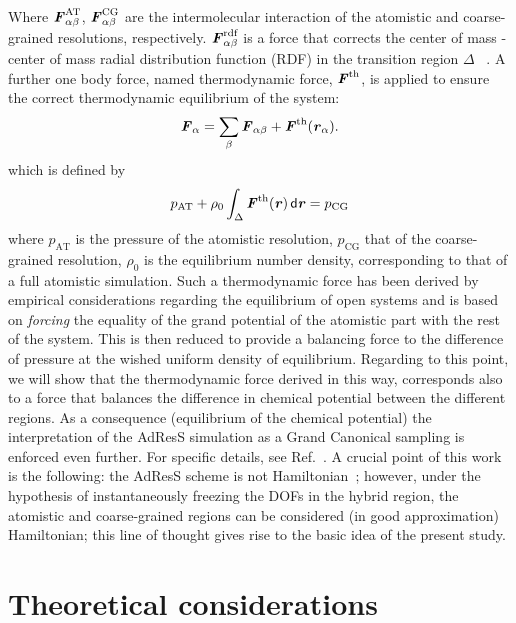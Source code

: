 \documentclass[aip,jcp,a4paper,reprint,onecolumn]{revtex4-1}
\newcommand{\vect}[1]{\textbf{\textit{#1}}}
\newcommand{\dd}[1]{\textsf{#1}}
\newcommand{\AT}{{\textrm{{AT}}}}
\newcommand{\CG}{{\textrm{CG}}}
\newcommand{\rdf}{{\textrm{rdf}}}
\begin{document}
Where $ \vect F^{\AT}_{\alpha\beta}$, $ \vect F^{\CG}_{\alpha\beta}$
are the intermolecular interaction of the atomistic and coarse-grained
resolutions, respectively.  $\vect F_{\alpha\beta}^{\rdf}$ is a force that corrects the center of mass - center of mass radial distribution function (RDF) in the transition region $\Delta$ ~\cite{rdfcorr}. A further one body force, named thermodynamic force, ${\vect F}^{\textrm{th}}$, is applied to ensure the correct thermodynamic equilibrium of the system:
\begin{equation}
  {\vect F}_{\alpha}=
  \sum_{\beta}{\vect F}_{\alpha\beta}+
  {\vect F}^{\textrm{th}}(\vect r_\alpha).
\label{mody}
\end{equation}
which is defined by
\begin{equation}
  p_{\AT}+
  \rho_0
  \int_{\Delta} {\vect F}^\text{th}(\vect r)\,\dd d\vect r
  =p_{\CG}
  \label{thf}
\end{equation}
where $p_{\AT}$ is the pressure of the atomistic resolution, $p_{\CG}$ that of the coarse-grained resolution, $\rho_{0}$ is the equilibrium number density, corresponding to that of a full atomistic simulation.
Such a thermodynamic force has been derived by empirical considerations regarding the equilibrium of open systems and is based on {\it forcing} the equality of the grand potential of the atomistic part with the rest of the system.
This is then reduced to provide a balancing force to the difference of pressure at the wished uniform density of equilibrium. Regarding to this point, we will show that the thermodynamic force derived in this way, corresponds also to a force that balances the difference in chemical potential between the different regions. As a consequence (equilibrium of the chemical potential) the interpretation of the AdResS simulation as a Grand Canonical sampling is enforced even further.
For specific details, see Ref.~\cite{prlgc}. A crucial point of this work is the following: the 
AdResS scheme is not Hamiltonian~\cite{presolo,prlcomm}; however, under the hypothesis of instantaneously
freezing the DOFs in the hybrid region, the atomistic and
coarse-grained regions can be considered (in good approximation) Hamiltonian; this line of thought gives rise to the basic
idea of the present study.

\section{Theoretical considerations}
\end{document}
